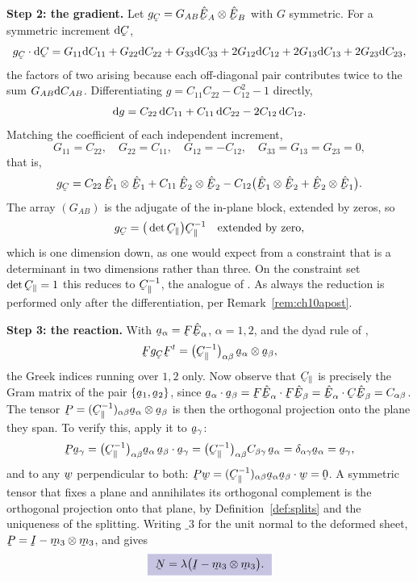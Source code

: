 \begin{solution}
\textbf{Step 2: the gradient.} Let $g_{\bC}=G_{AB}\hbE_{A}\otimes
\hbE_{B}$ with $G$ symmetric. For a symmetric increment $\dl\bC$,
\[
   g_{\bC}\cdot\dl\bC=G_{11}\dl C_{11}+G_{22}\dl C_{22}+G_{33}\dl C_{33}
   +2G_{12}\dl C_{12}+2G_{13}\dl C_{13}+2G_{23}\dl C_{23},
\]
the factors of two arising because each off-diagonal pair contributes
twice to the sum $G_{AB}\mathrm{d} C_{AB}$. Differentiating
$g=C_{11}C_{22}-C_{12}^{2}-1$ directly,
\[
   \mathrm{d} g=C_{22}\,\mathrm{d} C_{11}+C_{11}\,\mathrm{d} C_{22}-2C_{12}\,\mathrm{d} C_{12}.
\]
Matching the coefficient of each independent increment,
\[
   G_{11}=C_{22},\quad G_{22}=C_{11},\quad G_{12}=-C_{12},\quad
   G_{33}=G_{13}=G_{23}=0 ,
\]
that is,
\[
   g_{\bC}=C_{22}\,\hbE_{1}\otimes\hbE_{1}+C_{11}\,\hbE_{2}\otimes\hbE_{2}
   -C_{12}\big(\hbE_{1}\otimes\hbE_{2}+\hbE_{2}\otimes\hbE_{1}\big).
\]
The array $(G_{AB})$ is the adjugate of the in-plane block, extended by
zeros, so
\[
   g_{\bC}=\big(\det\bC_{\parallel}\big)\bC_{\parallel}^{-1}
   \quad\text{extended by zero},
\]
which is  one dimension down, as one would expect from a
constraint that is a determinant in two dimensions rather than three. On
the constraint set $\det\bC_{\parallel}=1$ this reduces to
$\bC_{\parallel}^{-1}$, the analogue of . As always the
reduction is performed only after the differentiation, per
Remark~\ref{rem:ch10apost}.

\textbf{Step 3: the reaction.} With $\ba_{\alpha}=\bF\hbE_{\alpha}$,
$\alpha=1,2$, and the dyad rule of ,
\[
   \bF g_{\bC}\bF^{t}
   =\big(\bC_{\parallel}^{-1}\big)_{\alpha\beta}\,
     \ba_{\alpha}\otimes\ba_{\beta},
\]
the Greek indices running over $1,2$ only. Now observe that
$\bC_{\parallel}$ is precisely the Gram matrix of the pair
$\{\ba_{1},\ba_{2}\}$, since
$\ip{\ba_{\alpha}}{\ba_{\beta}}=\ip{\bF\hbE_{\alpha}}{\bF\hbE_{\beta}}
=\ip{\hbE_{\alpha}}{\bC\hbE_{\beta}}=C_{\alpha\beta}$. The tensor
$\bP=(\bC_{\parallel}^{-1})_{\alpha\beta}\ba_{\alpha}\otimes\ba_{\beta}$
is then the orthogonal projection onto the plane they span. To verify
this, apply it to $\ba_{\gamma}$:
\[
   \bP\ba_{\gamma}
   =\big(\bC_{\parallel}^{-1}\big)_{\alpha\beta}
     \ba_{\alpha}\,\ip{\ba_{\beta}}{\ba_{\gamma}}
   =\big(\bC_{\parallel}^{-1}\big)_{\alpha\beta}
     C_{\beta\gamma}\,\ba_{\alpha}
   =\dd_{\alpha\gamma}\ba_{\alpha}=\ba_{\gamma},
\]
and to any $\bw$ perpendicular to both:
$\bP\bw=(\bC_{\parallel}^{-1})_{\alpha\beta}\ba_{\alpha}
\ip{\ba_{\beta}}\bw=\bze$. A symmetric tensor that fixes a plane and
annihilates its orthogonal complement is the orthogonal projection onto
that plane, by Definition~\ref{def:splits} and the uniqueness of the
splitting. Writing $\bm_{3}$ for the unit normal to the deformed sheet,
$\bP=\I-\bm_{3}\otimes\bm_{3}$, and  gives
\[
   \boxed{\ \bN=\lambda\big(\I-\bm_{3}\otimes\bm_{3}\big).\ }
\]


\end{solution}
